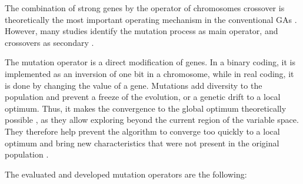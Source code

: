 \documentclass{ametsoc}
\begin{document}
The combination of strong genes by the operator of chromosomes crossover is theoretically the most important operating mechanism in the conventional GAs \citep{Holland1992b,Back1993b}. However, many studies identify the mutation process as main operator, and crossovers as secondary \citep[see][]{Back1992a,Back1996a,Back1996b,Smith1997a,Deb1999,Haupt2004,Costa2005a,Costa2007a}.

The mutation operator is a direct modification of genes. In a binary coding, it is implemented as an inversion of one bit in a chromosome, while in real coding, it is done by changing the value of a gene. Mutations add diversity to the population and prevent a freeze of the evolution, or a genetic drift to a local optimum. Thus, it makes the convergence to the global optimum theoretically possible \citep{Beasley1993a}, as they allow exploring beyond the current region of the variable space. They therefore help prevent the algorithm to converge too quickly to a local optimum and bring new characteristics that were not present in the original population \citep{Haupt2004}. 

The evaluated and developed mutation operators are the following:
\end{document}
